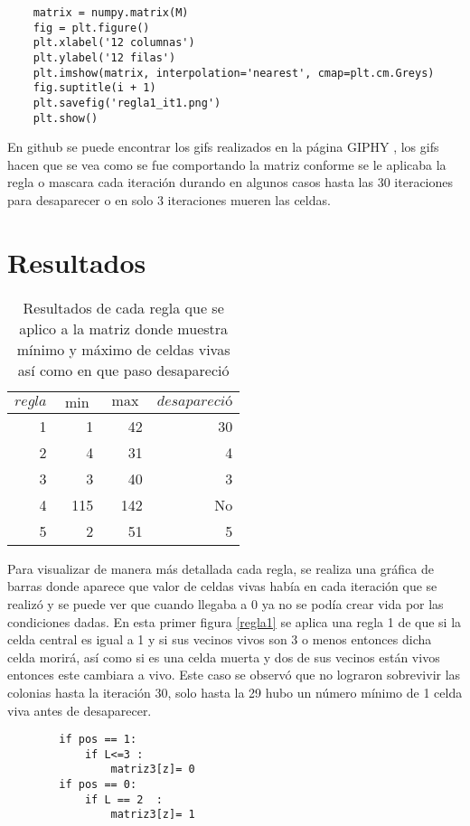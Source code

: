 \documentclass[a4paper, 11pt]{article}
\begin{document}
\begin{verbatim}
    matrix = numpy.matrix(M)   
    fig = plt.figure()
    plt.xlabel('12 columnas')
    plt.ylabel('12 filas')
    plt.imshow(matrix, interpolation='nearest', cmap=plt.cm.Greys)
    fig.suptitle(i + 1)
    plt.savefig('regla1_it1.png')
    plt.show()   
\end{verbatim}
En github \cite{Edson} se puede encontrar los gifs realizados en la página GIPHY \cite{GIPHY}, los gifs hacen que se vea como se fue comportando la matriz conforme se le aplicaba la regla o mascara cada iteración durando en algunos casos hasta las 30 iteraciones para desaparecer o en solo 3 iteraciones mueren las celdas. 
\section{Resultados}

    \begin{table}[H]
        \caption{Resultados de cada regla que se aplico a la matriz donde muestra mínimo y máximo de celdas vivas así como en que paso desapareció}
        \bigskip
        \label{tab1}
        \centering
        \begin{tabular}{|r|rr|r|}
        \hline
        $regla$&$\min$&$\max$&$desapareció$\\
        \hline
        1 & 1 & 42 & 30 \\
        2 & 4 & 31 & 4 \\
        3 & 3 & 40 & 3  \\
        4 & 115 & 142 & No \\
        5 & 2 & 51 & 5\\
        \hline
        \end{tabular}
    \end{table}
   
Para visualizar de manera más detallada cada regla, se realiza una gráfica de barras donde aparece que valor de celdas vivas había en cada iteración que se realizó y se puede ver que cuando llegaba a 0 ya no se podía crear vida por las condiciones dadas.
En esta primer figura \ref{regla1} se aplica una regla 1 de que si la celda central es igual a 1 y si sus vecinos vivos son 3 o menos entonces dicha celda morirá, así como si es una celda muerta y dos de sus vecinos están vivos entonces este cambiara a vivo. Este caso se observó que no lograron sobrevivir las colonias hasta la iteración 30, solo hasta la 29 hubo un número mínimo de 1 celda viva antes de desaparecer.   
\begin{verbatim}
        if pos == 1:  
            if L<=3 : 
                matriz3[z]= 0 
        if pos == 0:  
            if L == 2  :  
                matriz3[z]= 1
                
\end{verbatim}
\end{document}
